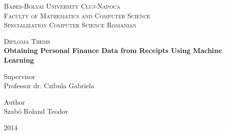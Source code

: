 \begin{titlepage}
    \begin{center}
        \vspace*{1cm}
        
        \Large
        \textsc{Babeș-Bolyai University Cluj-Napoca} \\
		\textsc{Faculty of Mathematics and Computer Science} \\
		\textsc{Specialization Computer Science Romanian}

		\vspace{1.5cm}
        \Huge
        \textsc{Diploma Thesis} \\[1cm]
        \textbf{Obtaining Personal Finance Data from Receipts Using Machine Learning}
\end{center}        

        \vspace{2cm}
		\Large
        \begin{minipage}[t]{0.5\textwidth}
       		Supervisor \\
        	Professor dr. Czibula Gabriela \\
		\end{minipage}
		\begin{minipage}[t]{0.5\textwidth}
			\begin{flushright}
				Author \\
				Szabó Roland Teodor
			\end{flushright}
		\end{minipage}
        \vfill

        \vspace{0.8cm}
\begin{center}
	\Huge
        2014
\end{center}
        
\end{titlepage}